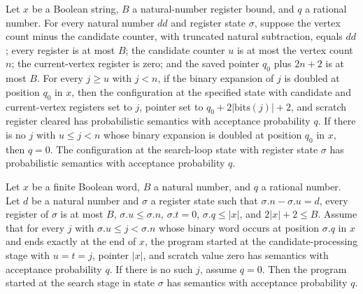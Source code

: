 \begin{lemma}
\label{Complexity.LogProg.ups_ssearch}
\leanok
{}
Let $x$ be a Boolean string, $B$ a natural-number register bound, and $q$ a rational
number. For every natural number $dd$ and register state $\sigma$, suppose the vertex
count minus the candidate counter, with truncated natural subtraction, equals $dd$;
every register is at most $B$; the candidate counter $u$ is at most the vertex count
$n$; the current-vertex register is zero; and the saved pointer $q_0$ plus $2n+2$ is at
most $B$. For every $j\ge u$ with $j<n$, if the binary expansion of $j$ is doubled at
position $q_0$ in $x$, then the configuration at the specified state with candidate and
current-vertex registers set to $j$, pointer set to $q_0+2|\mathrm{bits}(j)|+2$, and
scratch register cleared has probabilistic semantics with acceptance probability $q$. If
there is no $j$ with $u\le j<n$ whose binary expansion is doubled at position $q_0$ in
$x$, then $q=0$. The configuration at the search-loop state with register state $\sigma$
has probabilistic semantics with acceptance probability $q$.
\end{lemma}

\begin{lemma}
\label{Complexity.LogProg.ups_tsearch}
\leanok
{}
Let $x$ be a finite Boolean word, $B$ a natural number, and $q$ a rational number. Let
$d$ be a natural number and $\sigma$ a register state such that $\sigma.n-\sigma.u=d$,
every register of $\sigma$ is at most $B$, $\sigma.u\le\sigma.n$, $\sigma.t=0$,
$\sigma.q\le |x|$, and $2|x|+2\le B$. Assume that for every $j$ with $\sigma.u\le
j<\sigma.n$ whose binary word occurs at position $\sigma.q$ in $x$ and ends exactly at
the end of $x$, the program started at the candidate-processing stage with $u=t=j$,
pointer $|x|$, and scratch value zero has semantics with acceptance probability $q$. If
there is no such $j$, assume $q=0$. Then the program started at the search stage in
state $\sigma$ has semantics with acceptance probability $q$.
\end{lemma}

